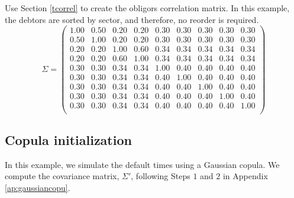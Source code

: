 \documentclass[a4paper,12pt,final]{article}
\begin{document}
Use Section \ref{tcorrel} to create the obligors correlation matrix. In 
this example, the debtors are sorted by sector, and therefore, no reorder is 
required.
\begin{displaymath}
\Sigma = 
\left( 
\begin{array}{cc|cc|ccccc}
 1.00 & 0.50 & 0.20 & 0.20 & 0.30 & 0.30 & 0.30 & 0.30 & 0.30 \\
 0.50 & 1.00 & 0.20 & 0.20 & 0.30 & 0.30 & 0.30 & 0.30 & 0.30 \\
\hline
 0.20 & 0.20 & 1.00 & 0.60 & 0.34 & 0.34 & 0.34 & 0.34 & 0.34 \\
 0.20 & 0.20 & 0.60 & 1.00 & 0.34 & 0.34 & 0.34 & 0.34 & 0.34 \\
\hline
 0.30 & 0.30 & 0.34 & 0.34 & 1.00 & 0.40 & 0.40 & 0.40 & 0.40 \\
 0.30 & 0.30 & 0.34 & 0.34 & 0.40 & 1.00 & 0.40 & 0.40 & 0.40 \\
 0.30 & 0.30 & 0.34 & 0.34 & 0.40 & 0.40 & 1.00 & 0.40 & 0.40 \\
 0.30 & 0.30 & 0.34 & 0.34 & 0.40 & 0.40 & 0.40 & 1.00 & 0.40 \\
 0.30 & 0.30 & 0.34 & 0.34 & 0.40 & 0.40 & 0.40 & 0.40 & 1.00 \\
\end{array}
\right)
\end{displaymath}

\subsection{Copula initialization}

In this example, we simulate the default times using a Gaussian copula. 
We compute the covariance matrix, $\Sigma'$, following Steps $1$ and $2$ 
in Appendix \ref{ap:gaussiancopu}.
\newline
\end{document}
